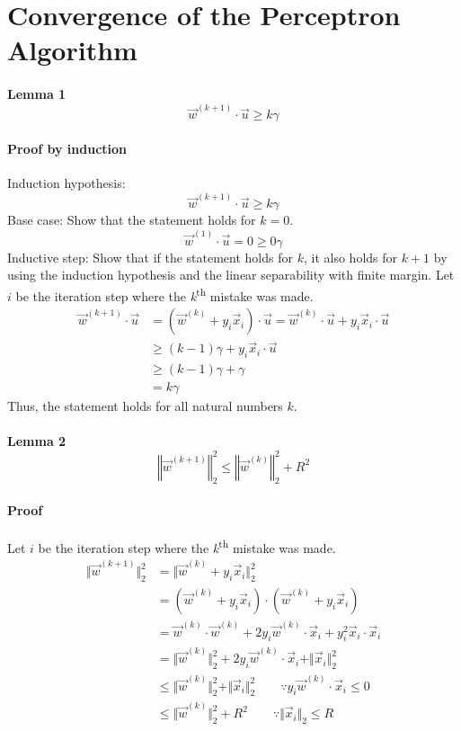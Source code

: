 \section{Convergence of the Perceptron Algorithm}
\paragraph{Lemma 1 
\[
\vec{w}^{(k+1)}\cdot\vec{u}\geq k\gamma
\]
}


\paragraph*{Proof by induction}

Induction hypothesis:
\[
\vec{w}^{(k+1)}\cdot\vec{u}\geq k\gamma
\]
Base case: Show that the statement holds for $k=0$.
\[
\vec{w}^{(1)}\cdot\vec{u}=0\geq0\gamma
\]
Inductive step: Show that if the statement holds for $k$, it also
holds for $k+1$ by using the induction hypothesis and the linear
separability with finite margin. Let $i$ be the iteration step where
the \emph{k}\textsuperscript{th} mistake was made.
\begin{align*}
\vec{w}^{(k+1)}\cdot\vec{u} & =(\vec{w}^{(k)}+y_{i}\vec{x}_{i})\cdot\vec{u}=\vec{w}^{(k)}\cdot\vec{u}+y_{i}\vec{x}_{i}\cdot\vec{u}\\
 & \geq(k-1)\gamma+y_{i}\vec{x}_{i}\cdot\vec{u}\\
 & \geq(k-1)\gamma+\gamma\\
 & =k\gamma
\end{align*}
Thus, the statement holds for all natural numbers $k$.


\paragraph*{Lemma 2
\[
\left\Vert \vec{w}^{(k+1)}\right\Vert _{2}^{2}\leq\left\Vert \vec{w}^{(k)}\right\Vert _{2}^{2}+R^{2}
\]
}


\paragraph*{Proof}

Let $i$ be the iteration step where the \emph{k}\textsuperscript{th}
mistake was made.
\begin{align*}
\Vert\vec{w}^{(k+1)}\Vert_{2}^{2} & =\Vert\vec{w}^{(k)}+y_{i}\vec{x}_{i}\Vert_{2}^{2}\\
 & =\left(\vec{w}^{(k)}+y_{i}\vec{x}_{i}\right)\cdot\left(\vec{w}^{(k)}+y_{i}\vec{x}_{i}\right)\\
 & =\vec{w}^{(k)}\cdot\vec{w}^{(k)}+2y_{i}\vec{w}^{(k)}\cdot\vec{x}_{i}+y_{i}^{2}\vec{x}_{i}\cdot\vec{x}_{i}\\
 & =\Vert\vec{w}^{(k)}\Vert_{2}^{2}+2y_{i}\vec{w}^{(k)}\cdot\vec{x}_{i}+\Vert\vec{x}_{i}\Vert_{2}^{2}\\
 & \leq\Vert\vec{w}^{(k)}\Vert_{2}^{2}+\Vert\vec{x}_{i}\Vert_{2}^{2}\qquad\because y_{i}\vec{w}^{(k)}\cdot\vec{x}_{i}\leq0\\
 & \leq\Vert\vec{w}^{(k)}\Vert_{2}^{2}+R^{2}\qquad\because\Vert\vec{x}_{i}\Vert_{2}\leq R
\end{align*}



